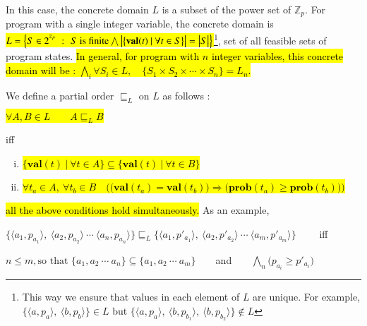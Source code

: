 \documentclass[final,3p, review, times]{util/elsarticle}
\begin{document}
In this case, the concrete domain $L$ is a subset of the power set of $\mathbb{Z}_p$. For program with a single integer variable, the concrete domain is \hl{$L=\Big\{S\in2^{^{\mathbb{Z}_p}}\ \Large:\ \normalsize S\ \text{is finite}\bigwedge\big|\big\{\mathbf{val}(t)\ |\ \forall t\in S\big\}\big|=\big|S\big|\Big\}$}\footnote{This way we ensure that values in each element of $L$ are unique. For example, $\Big\{\langle a,p_a\rangle,\ \langle b,p_b\rangle\Big\}\in L$ but $\Big\{\langle a,p_a\rangle,\ \langle b,p_{b_1}\rangle,\ \langle b,p_{b_2}\rangle\Big\}\notin L$}, set of all feasible sets of program states. \hl{In general, for program with $n$ integer variables, this concrete domain will be : $\displaystyle\bigwedge_i \forall S_i\in L,\quad\Big\{S_1\times S_2\times\cdots\times S_n\Big\}=L_n.$}

We define a partial order $\sqsubseteq_L$ on $L$ as follows :

\centerline{\hl{$\forall A,B\in L\qquad A\sqsubseteq_L B$}}
iff
\begin{enumerate}[i)]
\item \hl{$\Big\{\mathbf{val}(t)\ \big|\ \forall t\in A\Big\}\subseteq\Big\{\mathbf{val}(t)\ \big|\ \forall t\in B\Big\}$}
\item \hl{$\forall t_a\in A,\ \forall t_b\in B\quad\bigg(\Big(\mathbf{val}(t_a)=\mathbf{val}(t_b)\Big)\Rightarrow\Big(\mathbf{prob}(t_a)\geq\mathbf{prob}(t_b)\Big)\bigg)$}
\end{enumerate}
\hl{all the above conditions hold simultaneously.} As an example,\\
\centerline{
  $\Big\{\langle a_1,p_{a_1}\rangle,\ \langle a_2,p_{a_2}\rangle\ \cdots\ \langle a_n,p_{a_n}\rangle\Big\}\sqsubseteq_L\Big\{\langle a_1,p'_{a_1}\rangle,\ \langle a_2,p'_{a_2}\rangle\ \cdots\ \langle a_m,p'_{a_m}\rangle\Big\}\qquad$ iff
}
\centerline{
  $n\leq m, \text{so that\ }\big\{a_1,a_2\ \cdots\ a_n\big\}\subseteq\big\{a_1,a_2\ \cdots\ a_m\big\}\qquad$and$\qquad\displaystyle\bigwedge_n \big(p_{a_i}\geq p'_{a_i}\big)$
}
\end{document}

